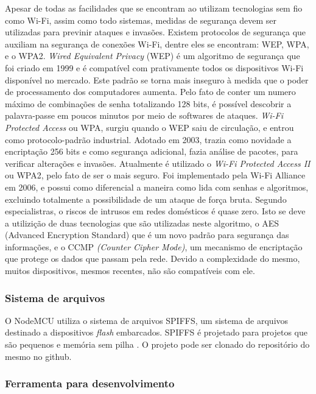 \documentclass[journal]{IEEEtran}
\begin{document}
Apesar de todas as facilidades que se encontram ao utilizam tecnologias sem fio como Wi-Fi, assim como todo sistemas, medidas de segurança devem ser utilizadas para previnir ataques e invasões. Existem protocolos de segurança que auxiliam na segurança de conexões Wi-Fi, dentre eles se encontram: WEP, WPA, e o WPA2. \emph{Wired Equivalent Privacy} (WEP) é um algoritmo de segurança que foi criado em 1999 e é compatível com prativamente todos os dispositivos Wi-Fi disponível no mercado. Este padrão se torna mais inseguro à medida que o poder de processamento dos computadores aumenta. Pelo fato de conter um numero máximo de combinações de senha totalizando 128 bits, é possível descobrir a palavra-passe em poucos minutos por meio de softwares de ataques. \emph{Wi-Fi Protected Access} ou WPA, surgiu quando o WEP saiu de circulação, e entrou como protocolo-padrão industrial. Adotado em 2003, trazia como novidade a encriptação 256 bits e como segurança adicional, fazia análise de pacotes, para verificar alterações e invasões. Atualmente é utilizado o \emph{Wi-Fi Protected Access II} ou WPA2, pelo fato de ser o mais seguro. Foi implementado pela Wi-Fi Alliance em 2006, e possui como diferencial a maneira como lida com senhas e algoritmos, excluindo totalmente a possibilidade de um ataque de força bruta. Segundo especialistras, o riscos de intrusos em redes domésticos é quase zero. Isto se deve a utilizição de duas tecnologias que são utilizadas neste algoritmo, o AES (Advanced Encryption Standard) que é um novo padrão para segurança das informações, e o CCMP \emph{(Counter Cipher Mode)}, um mecanismo de encriptação que protege os dados que passam pela rede. Devido a complexidade do mesmo, muitos dispositivos, mesmos recentes, não são compatíveis com ele. \cite{wifitecmundo}

\subsubsection{Sistema de arquivos}

O NodeMCU utiliza o sistema de arquivos SPIFFS, um sistema de arquivos destinado a dispositivos \emph{flash} embarcados. SPIFFS é projetado para projetos que são pequenos e memória sem pilha \cite{SPIFFS}. O projeto pode ser clonado do repositório do mesmo no github.

\subsubsection{Ferramenta para desenvolvimento}
\end{document}
